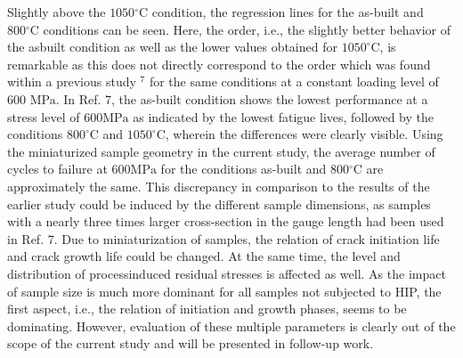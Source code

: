 \documentclass[10pt]{article}
\begin{document}
Slightly above the $1050{ }^{\circ} \mathrm{C}$ condition, the regression lines for the as-built and $800{ }^{\circ} \mathrm{C}$ conditions can be seen. Here, the order, i.e., the slightly better behavior of the asbuilt condition as well as the lower values obtained for $1050^{\circ} \mathrm{C}$, is remarkable as this does not directly correspond to the order which was found within a previous study ${ }^{7}$ for the same conditions at a constant loading level of 600 MPa. In Ref. 7, the as-built condition shows the lowest performance at a stress level of $600 \mathrm{MPa}$ as indicated by the lowest fatigue lives, followed by the conditions $800^{\circ} \mathrm{C}$ and $1050^{\circ} \mathrm{C}$, wherein the differences were clearly visible. Using the miniaturized sample geometry in the current study, the average number of cycles to failure at $600 \mathrm{MPa}$ for the conditions as-built and $800{ }^{\circ} \mathrm{C}$ are approximately the same. This discrepancy in comparison to the results of the earlier study could be induced by the different sample dimensions, as samples with a nearly three times larger cross-section in the gauge length had been used in Ref. 7. Due to miniaturization of samples, the relation of crack initiation life and crack growth life could be changed. At the same time, the level and distribution of processinduced residual stresses is affected as well. As the impact of sample size is much more dominant for all samples not subjected to HIP, the first aspect, i.e., the relation of initiation and growth phases, seems to be dominating. However, evaluation of these multiple parameters is clearly out of the scope of the current study and will be presented in follow-up work.
\end{document}
